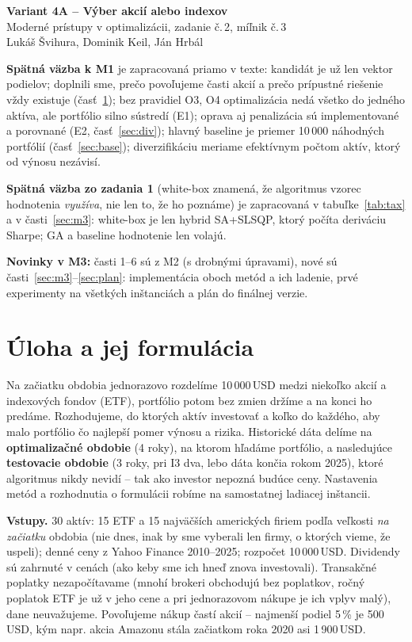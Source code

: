 \documentclass[10pt,a4paper]{article}
\begin{document}
\begin{center}
{\Large\bfseries Variant 4A -- Výber akcií alebo indexov}\\[3pt]
Moderné prístupy v optimalizácii, zadanie č.\,2, míľnik č.\,3\\[2pt]
Lukáš Švihura, Dominik Keil, Ján Hrbál
\end{center}

\textbf{Spätná väzba k M1} je zapracovaná priamo v texte: kandidát je už len vektor podielov; doplnili sme,
prečo povoľujeme časti akcií a prečo prípustné riešenie vždy existuje (časť~\ref{sec:form}); bez pravidiel
O3, O4 optimalizácia nedá všetko do jedného aktíva, ale portfólio silno sústredí (E1); oprava aj penalizácia
sú implementované a porovnané (E2, časť~\ref{sec:div}); hlavný baseline je priemer 10\,000 náhodných
portfólií (časť~\ref{sec:base}); diverzifikáciu meriame efektívnym počtom aktív, ktorý od výnosu nezávisí.

\textbf{Spätná väzba zo zadania 1} (white-box znamená, že algoritmus vzorec hodnotenia \emph{využíva}, nie
len to, že ho poznáme) je zapracovaná v tabuľke~\ref{tab:tax} a v časti~\ref{sec:m3}: white-box je len hybrid
SA+SLSQP, ktorý počíta deriváciu Sharpe; GA a baseline hodnotenie len volajú.

\textbf{Novinky v M3:} časti 1--6 sú z M2 (s drobnými úpravami), nové sú časti~\ref{sec:m3}--\ref{sec:plan}:
implementácia oboch metód a ich ladenie, prvé experimenty na všetkých inštanciách
a plán do finálnej verzie.

\section{Úloha a jej formulácia}
\label{sec:form}

Na začiatku obdobia jednorazovo rozdelíme 10\,000\,USD medzi niekoľko akcií a indexových fondov (ETF),
portfólio potom bez zmien držíme a na konci ho predáme. Rozhodujeme, do ktorých aktív investovať
a koľko do každého, aby malo portfólio čo najlepší pomer výnosu a rizika. Historické dáta delíme na
\textbf{optimalizačné obdobie} (4 roky), na ktorom hľadáme portfólio, a nasledujúce \textbf{testovacie
obdobie} (3 roky, pri I3 dva, lebo dáta končia rokom 2025), ktoré algoritmus nikdy nevidí -- tak ako investor nepozná budúce ceny. Nastavenia
metód a rozhodnutia o formulácii robíme na samostatnej ladiacej inštancii.

\textbf{Vstupy.} 30 aktív: 15 ETF a 15 najväčších amerických firiem podľa veľkosti \emph{na začiatku}
obdobia (nie dnes, inak by sme vyberali len firmy, o ktorých vieme, že uspeli); denné ceny z Yahoo Finance
2010--2025; rozpočet 10\,000\,USD. Dividendy sú zahrnuté v cenách (ako keby sme ich hneď znova
investovali). Transakčné poplatky nezapočítavame (mnohí brokeri obchodujú bez poplatkov, ročný poplatok ETF
je už v jeho cene a pri jednorazovom nákupe je ich vplyv malý), dane neuvažujeme. Povoľujeme nákup častí akcií -- najmenší podiel
5\,\% je 500\,USD, kým napr. akcia Amazonu stála začiatkom roka 2020 asi 1\,900\,USD.
\end{document}
